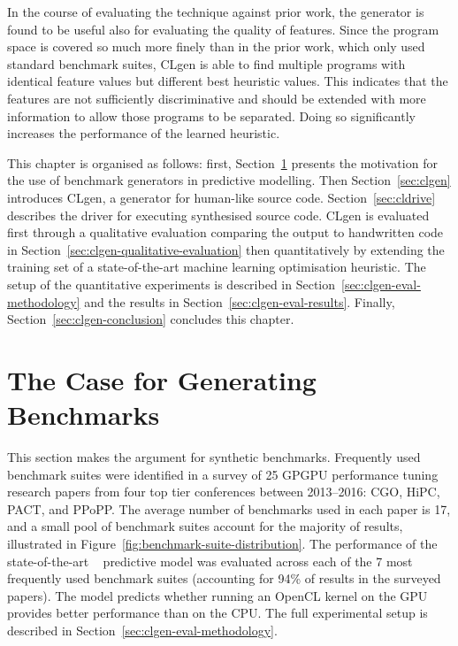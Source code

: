 In the course of evaluating the technique against prior work, the generator is found to be useful also for evaluating the quality of features. Since the program space is covered so much more finely than in the prior work, which only used standard benchmark suites, CLgen is able to find multiple programs with identical feature values but different best heuristic values. This indicates that the features are not sufficiently discriminative and should be extended with more information to allow those programs to be separated. Doing so significantly increases the performance of the learned heuristic.

This chapter is organised as follows: first, Section~\ref{sec:the-case-for-benchmark-generators} presents the motivation for the use of benchmark generators in predictive modelling. Then Section~\ref{sec:clgen} introduces CLgen, a generator for human-like source code. Section~\ref{sec:cldrive} describes the driver for executing synthesised source code. CLgen is evaluated first through a qualitative evaluation comparing the output to handwritten code in Section~\ref{sec:clgen-qualitative-evaluation} then quantitatively by extending the training set of a state-of-the-art machine learning optimisation heuristic. The setup of the quantitative experiments is described in Section~\ref{sec:clgen-eval-methodology} and the results in Section~\ref{sec:clgen-eval-results}. Finally, Section~\ref{sec:clgen-conclusion} concludes this chapter.


\section{The Case for Generating Benchmarks}%
\label{sec:the-case-for-benchmark-generators}

This section makes the argument for synthetic benchmarks. Frequently used benchmark suites were identified in a survey of 25 GPGPU performance tuning research papers from four top tier conferences between 2013--2016: CGO, HiPC, PACT, and PPoPP. The average number of benchmarks used in each paper is 17, and a small pool of benchmark suites account for the majority of results, illustrated in Figure~\ref{fig:benchmark-suite-distribution}. The performance of the state-of-the-art \citeauthor{Grewe2013}~\cite{Grewe2013} predictive model was evaluated across each of the 7 most frequently used benchmark suites (accounting for 94\% of results in the surveyed papers). The model predicts whether running an OpenCL kernel on the GPU provides better performance than on the CPU. The full experimental setup is described in Section~\ref{sec:clgen-eval-methodology}.

